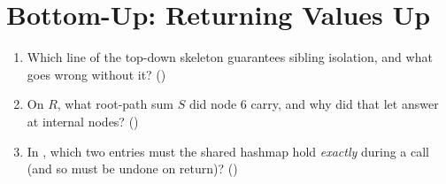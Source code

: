 \section{Bottom-Up: Returning Values Up}\label{sec:c02-bottomup}

\begin{previouslybox}
\begin{enumerate}[nosep, leftmargin=1.6em]
  \item Which line of the top-down skeleton guarantees sibling isolation, and
        what goes wrong without it? ()
  \item On $R$, what root-path sum $S$ did node $6$ carry, and why did that let
         answer at internal nodes? ()
  \item In , which two entries must the shared hashmap
        hold \emph{exactly} during a call (and so must be undone on return)?
        ()
\end{enumerate}
\end{previouslybox}

